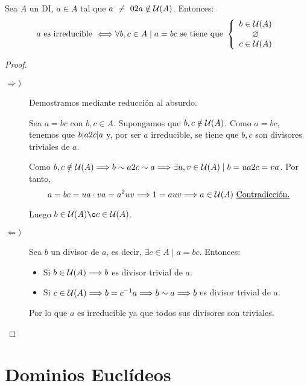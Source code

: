 \begin{prop}
    Sea $A$ un DI, $a \in A$ tal que $a~\neq~0 2 a \notin \mathcal{U}(A)$. Entonces:
    $$a \mbox{ es irreducible } \Longleftrightarrow \forall b,c \in A \mid a=bc \text{ se tiene que }
    \left\{\begin{array}{c}
        b \in \cc{U}(A) \\ \o \\ c \in \cc{U}(A)
    \end{array}\right.$$
\end{prop}
\begin{proof}\
\begin{description}
    \item[$\Longrightarrow)$]Demostramos mediante reducción al absurdo.
    
    Sea $a=bc$ con $b,c \in A$. Supongamos que $b,c \notin \mathcal{U}(A)$. Como $a=bc$, tenemos que $b|a 2 c|a$ y, por ser $a$ irreducible, se tiene que $b,c$ son divisores triviales de $a$.
    
    Como $b,c \notin \mathcal{U}(A) \Longrightarrow b \sim a 2 c \sim a \Longrightarrow \exists u,v \in \mathcal{U}(A) \mid b=ua 2 c=va$. Por tanto,
    $$a=bc = ua \cdot va = a^2 uv \Longrightarrow 1=auv \Longrightarrow a \in \mathcal{U}(A) \mbox{ \underline{Contradicción.}}$$
    
    Luego $b \in \cc{U}(A) \o c \in \cc{U}(A)$.
    
    \item[$\Longleftarrow)$] Sea $b$ un divisor de $a$, es decir, $\exists c\in A\mid a=bc$. Entonces:
    \begin{itemize}
        \item Si $b \in \mathcal{U}(A) \Longrightarrow b$ es divisor trivial de $a$.
        \item Si $c \in \mathcal{U}(A) \Longrightarrow b=c^{-1}a \Longrightarrow b\sim a \Longrightarrow b$ es divisor trivial de $a$.
    \end{itemize}
    
    Por lo que $a$ es irreducible ya que todos sus divisores son triviales.
\end{description}
\end{proof}

\section{Dominios Euclídeos}

